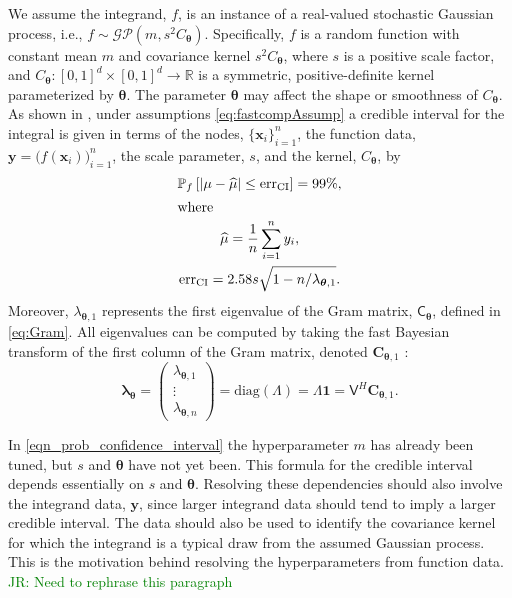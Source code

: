 \documentclass[graybox,footinfo]{svmult}
\newcommand{\bm}[1]{\boldsymbol{#1}}
\newcommand{\vlambda}{{\bm{\lambda}}}
\newcommand{\vtheta}{{\bm{\theta}}}
\newcommand{\vC}{\bm{C}}
\newcommand{\vx}{\bm{x}}
\newcommand{\vy}{\bm{y}}
\newcommand{\vone}{\bm{1}}
\newcommand{\mC}{\mathsf{C}}
\newcommand{\mLambda}{\mathsf{\Lambda}}
\newcommand{\mV}{\mathsf{V}}
\newcommand{\hmu}{\widehat{\mu}}
\newcommand{\CI}{\textup{CI}}
\newcommand{\diag}{\text{diag}}
\newcommand{\err}{\textup{err}}
\newcommand{\JRNote}[1]{{\textcolor{green}{JR: #1}}}
\begin{document}
We assume the integrand, $f$, is an instance of a real-valued stochastic Gaussian process, i.e., $f \sim \mathcal{GP}(m,s^2 C_\vtheta)$.  Specifically, $f$ is a random function with constant mean $m$ and covariance kernel $s^2C_\vtheta$, where $s$ is a positive scale factor, and $C_\vtheta: [0,1]^d \times [0,1]^d \to \mathbb{R} $ is a symmetric, positive-definite kernel parameterized by $\vtheta$.  The parameter $\vtheta$ may affect the shape or smoothness of $C_\vtheta$. As shown in \cite[Give eq numbers]{RatHic19a}, under assumptions \eqref{eq:fastcompAssump} a credible interval for the integral is given in terms of the nodes, $\{\vx_i\}_{i=1}^n$, the function data, $\vy = \bigl (f (\vx_i) \bigr)_{i=1}^n$, the scale parameter, $s$, and the kernel, $C_\vtheta$,  by 
\begin{subequations} \label{eqn_prob_confidence_interval}
	\begin{gather}
	\mathbb{P}_f \left[
	|\mu-\hmu| \leq \err_{\CI}
	\right] = 99\%, \\
	\intertext{where}
	\label{muhatGCV-FB-MLE-Simple}
	\hmu = \frac 1n \sum_{i=1}^n y_i, \\
	\label{eqn:errcifast}
	\err_{\CI} = 2.58 s \sqrt{1 - n/\lambda_{\vtheta,1} }.
	\end{gather}
\end{subequations}
Moreover, $\lambda_{\vtheta,1}$ represents the first eigenvalue of the Gram matrix, $\mC_\vtheta$, defined in \eqref{eq:Gram}.  All eigenvalues can be computed %
by taking the fast Bayesian transform of the first column of the Gram matrix, denoted $\vC_{\vtheta,1}$ \cite[Equation number]{RatHic19a}:
\begin{equation} 
	\vlambda_\vtheta
	= \begin{pmatrix}
		\lambda_{\vtheta,1} \\ \vdots \\ \lambda _{\vtheta,n}
	\end{pmatrix} = \diag(\mLambda) = \mLambda \vone 
	= \mV^H \vC_{\vtheta,1}.
	\label{eqn:fast_transform_to_eigvalues}
\end{equation}

In \eqref{eqn_prob_confidence_interval} the hyperparameter $m$ has already been tuned, but $s$ and $\vtheta$ have not yet been.  %
This formula for the credible interval depends essentially on $s$ and $\vtheta$.  Resolving these dependencies should also involve the integrand data,  $\vy$, since larger integrand data should tend to imply a larger credible interval. The data should also be used to identify the covariance kernel for which the integrand is a typical draw from the assumed Gaussian process. This is the motivation behind resolving the hyperparameters from function data. 
\JRNote{Need to rephrase this paragraph}
\end{document}
